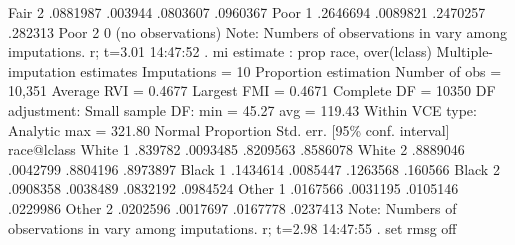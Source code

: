         Fair 2  {\VBAR}   .0881987    .003944      .0803607    .0960367
        Poor 1  {\VBAR}   .2646694   .0089821      .2470257     .282313
        Poor 2  {\VBAR}          0  (no observations)
Note: Numbers of observations in {} vary among imputations.
r; t=3.01 14:47:52
{\smallskip}
. mi estimate : prop race, over(lclass)
{\smallskip}
Multiple-imputation estimates     Imputations     =         10
Proportion estimation             Number of obs   =     10,351
                                  Average RVI     =     0.4677
                                  Largest FMI     =     0.4671
                                  Complete DF     =      10350
DF adjustment:   Small sample     DF:     min     =      45.27
                                          avg     =     119.43
Within VCE type:     Analytic             max     =     321.80
{\smallskip}
             {\VBAR}                                   Normal
             {\VBAR} Proportion   Std. err.     [95\% conf. interval]
 race@lclass {\VBAR}
    White 1  {\VBAR}    .839782   .0093485      .8209563    .8586078
    White 2  {\VBAR}   .8889046   .0042799      .8804196    .8973897
    Black 1  {\VBAR}   .1434614   .0085447      .1263568     .160566
    Black 2  {\VBAR}   .0908358   .0038489      .0832192    .0984524
    Other 1  {\VBAR}   .0167566   .0031195      .0105146    .0229986
    Other 2  {\VBAR}   .0202596   .0017697      .0167778    .0237413
Note: Numbers of observations in {} vary among imputations.
r; t=2.98 14:47:55
{\smallskip}
. set rmsg off
{\smallskip}
